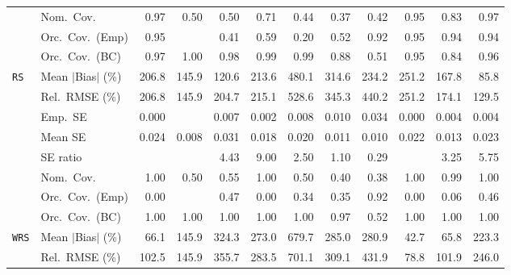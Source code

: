 \begin{landscape}
\begin{longtable}{llrrrrrrrrrr}
 & Nom.\ Cov. & \cellcolor{ranktwo}0.97 & 0.50 & 0.50 & 0.71 & 0.44 & 0.37 & 0.42 & \cellcolor{rankone}0.95 & \cellcolor{rankthree}0.83 & \cellcolor{ranktwo}0.97 \\
 & Orc.\ Cov.\ (Emp) & \cellcolor{rankone}0.95 &  & 0.41 & 0.59 & 0.20 & 0.52 & \cellcolor{rankthree}0.92 & \cellcolor{rankone}0.95 & \cellcolor{ranktwo}0.94 & \cellcolor{ranktwo}0.94 \\
 & Orc.\ Cov.\ (BC) & \cellcolor{rankthree}0.97 & 1.00 & 0.98 & 0.99 & 0.99 & 0.88 & 0.51 & \cellcolor{rankone}0.95 & 0.84 & \cellcolor{ranktwo}0.96 \\
\addlinespace[2pt]
\quad \texttt{RS} & Mean $|$Bias$|$ (\%) & 206.8 & \cellcolor{rankthree}145.9 & \cellcolor{ranktwo}120.6 & 213.6 & 480.1 & 314.6 & 234.2 & 251.2 & 167.8 & \cellcolor{rankone}85.8 \\
 & Rel.\ RMSE (\%) & 206.8 & \cellcolor{ranktwo}145.9 & 204.7 & 215.1 & 528.6 & 345.3 & 440.2 & 251.2 & \cellcolor{rankthree}174.1 & \cellcolor{rankone}129.5 \\
 & Emp.\ SE & 0.000 &  & 0.007 & 0.002 & 0.008 & 0.010 & 0.034 & 0.000 & 0.004 & 0.004 \\
 & Mean SE & 0.024 & 0.008 & 0.031 & 0.018 & 0.020 & 0.011 & 0.010 & 0.022 & 0.013 & 0.023 \\
 & SE ratio &  &  & 4.43 & 9.00 & \cellcolor{rankthree}2.50 & \cellcolor{rankone}1.10 & \cellcolor{ranktwo}0.29 &  & 3.25 & 5.75 \\
 & Nom.\ Cov. & \cellcolor{ranktwo}1.00 & 0.50 & \cellcolor{rankthree}0.55 & \cellcolor{ranktwo}1.00 & 0.50 & 0.40 & 0.38 & \cellcolor{ranktwo}1.00 & \cellcolor{rankone}0.99 & \cellcolor{ranktwo}1.00 \\
 & Orc.\ Cov.\ (Emp) & 0.00 &  & \cellcolor{ranktwo}0.47 & 0.00 & 0.34 & 0.35 & \cellcolor{rankone}0.92 & 0.00 & 0.06 & \cellcolor{rankthree}0.46 \\
 & Orc.\ Cov.\ (BC) & \cellcolor{ranktwo}1.00 & \cellcolor{ranktwo}1.00 & \cellcolor{ranktwo}1.00 & \cellcolor{ranktwo}1.00 & \cellcolor{ranktwo}1.00 & \cellcolor{rankone}0.97 & \cellcolor{rankthree}0.52 & \cellcolor{ranktwo}1.00 & \cellcolor{ranktwo}1.00 & \cellcolor{ranktwo}1.00 \\
\addlinespace[2pt]
\quad \texttt{WRS} & Mean $|$Bias$|$ (\%) & \cellcolor{rankthree}66.1 & 145.9 & 324.3 & 273.0 & 679.7 & 285.0 & 280.9 & \cellcolor{rankone}42.7 & \cellcolor{ranktwo}65.8 & 223.3 \\
 & Rel.\ RMSE (\%) & \cellcolor{rankthree}102.5 & 145.9 & 355.7 & 283.5 & 701.1 & 309.1 & 431.9 & \cellcolor{rankone}78.8 & \cellcolor{ranktwo}101.9 & 246.0 \\

\end{longtable}
\end{landscape}
